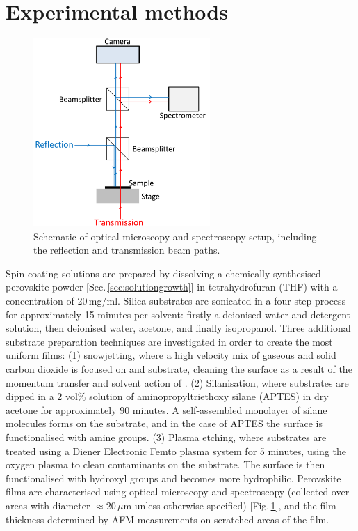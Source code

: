 \section{Experimental methods}
\label{sec:glass}
\begin{figure}[h!]
\centering    
\includegraphics[width=0.6\textwidth]{Microscope}
\caption{Schematic of optical microscopy and spectroscopy setup, including the reflection and transmission beam paths.}
\label{Microscope}
\end{figure}
Spin coating solutions are prepared by dissolving a chemically synthesised perovskite powder [Sec.\,\ref{sec:solutiongrowth}] in tetrahydrofuran (THF) with a concentration of 20\,mg/ml. Silica substrates are sonicated in a four-step process for approximately 15 minutes per solvent: firstly a deionised water and detergent solution, then deionised water, acetone, and finally isopropanol. Three additional substrate preparation techniques are investigated in order to create the most uniform films: (1)  snowjetting, where a high velocity mix of gaseous and solid carbon dioxide is focused on and substrate, cleaning the surface as a result of the momentum transfer and solvent action of  \cite{Snowjet}. (2) Silanisation, where substrates are dipped in a 2 vol\% solution of aminopropyltriethoxy silane (APTES) in dry acetone for approximately 90 minutes. A self-assembled monolayer of silane molecules forms on the substrate, and in the case of APTES the surface is functionalised with amine groups. (3) Plasma etching, where substrates are treated using a Diener Electronic Femto plasma system for 5 minutes, using the oxygen plasma to clean contaminants on the substrate. The surface is then functionalised with hydroxyl groups and becomes more hydrophilic. Perovskite films are characterised using optical microscopy and spectroscopy (collected over areas with diameter $\approx 20\,\mu$m unless otherwise specified) [Fig.\,\ref{Microscope}], and the film thickness determined by AFM measurements on scratched areas of the film.

